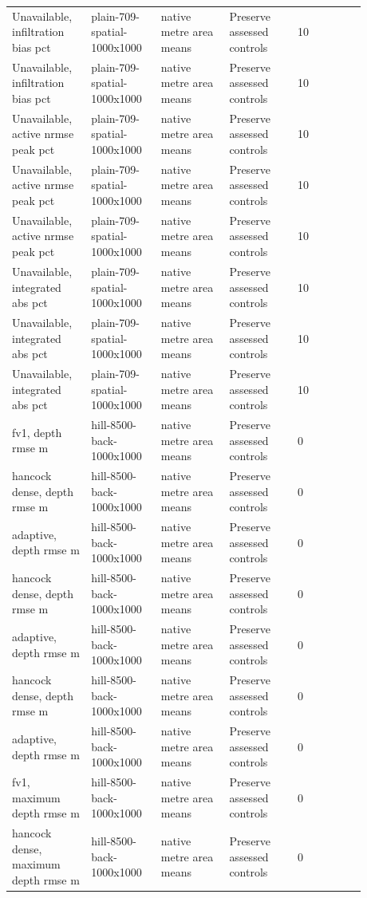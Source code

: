 \begin{longtable}{p{0.1760\linewidth}p{0.1760\linewidth}p{0.1760\linewidth}p{0.1760\linewidth}p{0.1760\linewidth}}
Unavailable, infiltration bias pct & plain-709-spatial-1000x1000 & native metre area means & Preserve assessed controls & 10 \\
Unavailable, infiltration bias pct & plain-709-spatial-1000x1000 & native metre area means & Preserve assessed controls & 10 \\
Unavailable, active nrmse peak pct & plain-709-spatial-1000x1000 & native metre area means & Preserve assessed controls & 10 \\
Unavailable, active nrmse peak pct & plain-709-spatial-1000x1000 & native metre area means & Preserve assessed controls & 10 \\
Unavailable, active nrmse peak pct & plain-709-spatial-1000x1000 & native metre area means & Preserve assessed controls & 10 \\
Unavailable, integrated abs pct & plain-709-spatial-1000x1000 & native metre area means & Preserve assessed controls & 10 \\
Unavailable, integrated abs pct & plain-709-spatial-1000x1000 & native metre area means & Preserve assessed controls & 10 \\
Unavailable, integrated abs pct & plain-709-spatial-1000x1000 & native metre area means & Preserve assessed controls & 10 \\
fv1, depth rmse m & hill-8500-back-1000x1000 & native metre area means & Preserve assessed controls & 0 \\
hancock dense, depth rmse m & hill-8500-back-1000x1000 & native metre area means & Preserve assessed controls & 0 \\
adaptive, depth rmse m & hill-8500-back-1000x1000 & native metre area means & Preserve assessed controls & 0 \\
hancock dense, depth rmse m & hill-8500-back-1000x1000 & native metre area means & Preserve assessed controls & 0 \\
adaptive, depth rmse m & hill-8500-back-1000x1000 & native metre area means & Preserve assessed controls & 0 \\
hancock dense, depth rmse m & hill-8500-back-1000x1000 & native metre area means & Preserve assessed controls & 0 \\
adaptive, depth rmse m & hill-8500-back-1000x1000 & native metre area means & Preserve assessed controls & 0 \\
fv1, maximum depth rmse m & hill-8500-back-1000x1000 & native metre area means & Preserve assessed controls & 0 \\
hancock dense, maximum depth rmse m & hill-8500-back-1000x1000 & native metre area means & Preserve assessed controls & 0 \\

\end{longtable}
